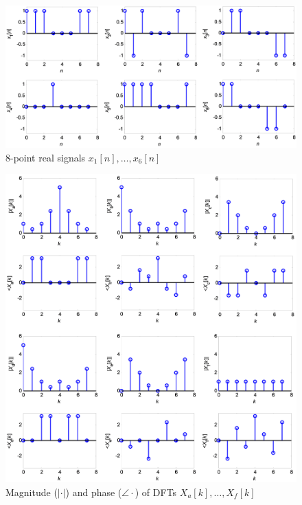 \documentclass[12pt]{report}
\begin{document}
\FloatBarrier
\begin{figure}[h!]
	\centering
	\includegraphics[width=\textwidth]{figs/signals_match_dft.png}
	\caption{8-point real signals $x_1[n], \ldots, x_6[n]$}
	\label{fig:sequences}
\end{figure}
\FloatBarrier

\FloatBarrier
\begin{figure}[h!]
	\centering
	\includegraphics[width=\textwidth]{figs/dfts_mag.png}
	\caption{Magnitude ($|\cdot|$) and phase ($\angle \cdot$) of DFTs $X_a[k], \ldots, X_f[k]$}
	\label{fig:dfts}
\end{figure}
\FloatBarrier
 
\end{document}

